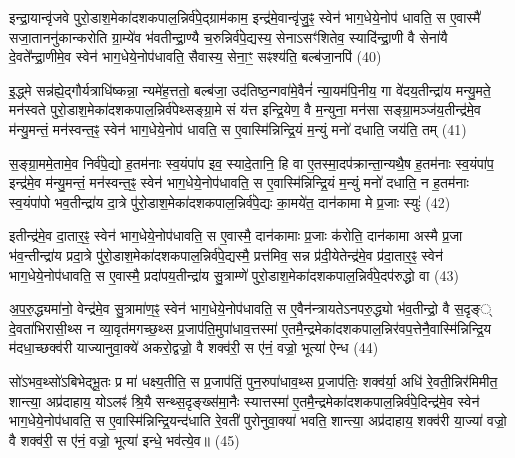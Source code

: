 {\anuvakamend[{इ॒न्द्रि॒याव॑न्त॒ꣴ॒ स्वेन॑ भाग॒धेये॒नोप॑धावति॒ सो᳚\-ऽर्कव॑न्त॒ꣴ॒ स्वेन॑ भाग॒धेये॑नै॒वेन्द्रा॑यास्मा॒न्मृधो᳚\-ऽस्मै स॒प्त च॑।7।}]}

इन्द्रा॒यान्वृ॑जवे पुरो॒डाश॒मेका॑दशकपाल॒न्निर्व॑पे॒द्ग्राम॑काम॒ इन्द्र॑मे॒वान्वृ॑जु॒ꣴ॒ स्वेन॑ भाग॒धेये॒नोप॑ धावति॒ स ए॒वास्मै॑ सजा॒ताननु॑कान्करोति ग्रा॒म्ये॑व भ॑वतीन्द्रा॒ण्यै च॒रुन्निर्व॑पे॒द्यस्य॒ सेना\-ऽसꣳ॑शितेव॒ स्यादि॑न्द्रा॒णी वै सेना॑यै दे॒वते᳚न्द्रा॒णीमे॒व स्वेन॑ भाग॒धेये॒नोप॑धावति॒ सैवास्य॒ सेना॒ꣳ॒ सꣴश्य॑ति॒ बल्ब॑जा॒नपि॑ (40)

इ॒द्ध्मे सन्न॑ह्ये॒द्गौर्यत्राधि॑ष्कन्ना॒ न्यमे॑ह॒त्ततो॒ बल्ब॑जा॒ उद॑तिष्ठ॒न्गवा॑मे॒वैनं॑ न्या॒यम॑पि॒नीय॒ गा वे॑दय॒तीन्द्रा॑य मन्यु॒मते॒ मन॑स्वते पुरो॒डाश॒मेका॑दशकपाल॒न्निर्व॑पेथ्सङ्ग्रा॒मे सं य॑त्त इन्द्रि॒येण॒ वै म॒न्युना॒ मन॑सा सङ्ग्रा॒मञ्ज॑य॒तीन्द्र॑मे॒व म॑न्यु॒मन्तं॒ मन॑स्वन्त॒ꣴ॒ स्वेन॑ भाग॒धेये॒नोप॑ धावति॒ स ए॒वास्मि॑न्निन्द्रि॒यं म॒न्युं मनो॑ दधाति॒ जय॑ति॒ तम् (41)

स॒ङ्ग्रा॒ममे॒तामे॒व निर्व॑पे॒द्यो ह॒तम॑नाः स्व॒यंपा॑प इव॒ स्यादे॒तानि॒ हि वा ए॒तस्मा॒दप॑क्रान्ता॒न्यथै॒ष ह॒तम॑नाः स्व॒यंपा॑प॒ इन्द्र॑मे॒व म॑न्यु॒मन्तं॒ मन॑स्वन्त॒ꣴ॒ स्वेन॑ भाग॒धेये॒नोप॑धावति॒ स ए॒वास्मि॑न्निन्द्रि॒यं म॒न्युं मनो॑ दधाति॒ न ह॒तम॑नाः स्व॒यंपा॑पो भव॒तीन्द्रा॑य दा॒त्रे पु॑रो॒डाश॒मेका॑दशकपाल॒न्निर्व॑पे॒द्यः का॒मये॑त॒ दान॑कामा मे प्र॒जाः स्युः॑ (42)

इतीन्द्र॑मे॒व दा॒तार॒ꣴ॒ स्वेन॑ भाग॒धेये॒नोप॑धावति॒ स ए॒वास्मै॒ दान॑कामाः प्र॒जाः क॑रोति॒ दान॑कामा अस्मै प्र॒जा भ॑व॒न्तीन्द्रा॑य प्रदा॒त्रे पु॑रो॒डाश॒मेका॑दशकपाल॒न्निर्व॑पे॒द्यस्मै॒ प्रत्त॑मिव॒ सन्न प्र॑दी॒येतेन्द्र॑मे॒व प्र॑दा॒तार॒ꣴ॒ स्वेन॑ भाग॒धेये॒नोप॑धावति॒ स ए॒वास्मै॒ प्रदा॑पय॒तीन्द्रा॑य सु॒त्राम्णे॑ पुरो॒डाश॒मेका॑दशकपाल॒न्निर्व॑पे॒दप॑रुद्धो वा (43)

अ॒प॒रु॒द्ध्यमा॑नो॒ वेन्द्र॑मे॒व सु॒त्रामा॑ण॒ꣴ॒ स्वेन॑ भाग॒धेये॒नोप॑धावति॒ स ए॒वैन॑न्त्रायते\-ऽनपरु॒द्ध्यो भ॑व॒तीन्द्रो॒ वै स॒दृङ्् दे॒वता॑भिरासी॒थ्स न व्या॒वृत॑मगच्छ॒थ्स प्र॒जाप॑ति॒मुपा॑धाव॒त्तस्मा॑ ए॒तमै॒न्द्रमेका॑दशकपाल॒न्निर॑वप॒त्तेनै॒वास्मि॑न्निन्द्रि॒य म॑दधा॒च्छक्व॑री याज्यानुवा॒क्ये॑ अकरो॒द्वज्रो॒ वै शक्व॑री॒ स ए॑नं॒ वज्रो॒ भूत्या॑ ऐन्ध (44)

सो॑\-ऽभव॒थ्सो॑\-ऽबिभेद्भू॒तः प्र मा॑ धक्ष्य॒तीति॒ स प्र॒जाप॑तिं॒ पुन॒रुपा॑धाव॒थ्स प्र॒जाप॑तिः॒ शक्व॑र्या॒ अधि॑ रे॒वती॒न्निर॑मिमीत॒ शान्त्या॒ अप्र॑दाहाय॒ यो\-ऽलꣴ॑ श्रि॒यै सन्थ्स॒दृङ्ख्स॑मा॒नैः स्यात्तस्मा॑ ए॒तमै॒न्द्रमेका॑दशकपाल॒न्निर्व॑पे॒दिन्द्र॑मे॒व स्वेन॑ भाग॒धेये॒नोप॑धावति॒ स ए॒वास्मि॑न्निन्द्रि॒यन्द॑धाति रे॒वती॑ पुरोनुवा॒क्या॑ भवति॒ शान्त्या॒ अप्र॑दाहाय॒ शक्व॑री या॒ज्या॑ वज्रो॒ वै शक्व॑री॒ स ए॑नं॒ वज्रो॒ भूत्या॑ इन्धे॒ भव॑त्ये॒व॥ (45)

